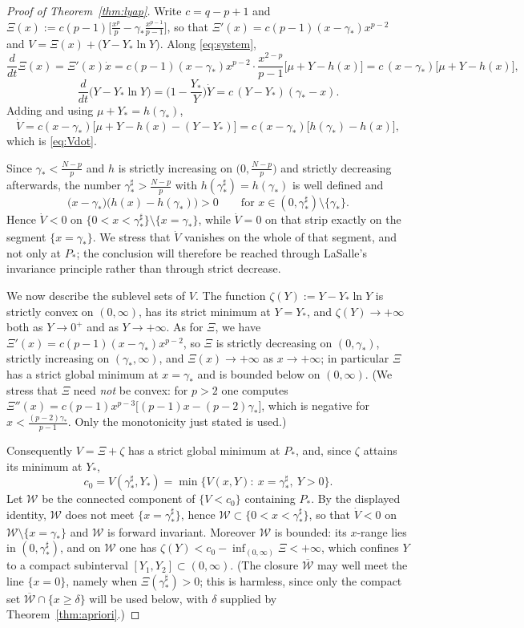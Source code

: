 \documentclass[11pt,reqno]{amsart}
\numberwithin{equation}{section}
\theoremstyle{plain}
\theoremstyle{definition}
\newcommand{\gs}{\gamma_{*}}
\begin{document}
\begin{proof}[Proof of Theorem~\ref{thm:lyap}]
Write $c=q-p+1$ and
$\Xi(x):=c(p-1)\big[\frac{x^{p}}{p}-\gs\frac{x^{p-1}}{p-1}\big]$, so that
$\Xi'(x)=c(p-1)(x-\gs)x^{p-2}$ and $V=\Xi(x)+\big(Y-Y_{*}\ln Y\big)$.
Along \eqref{eq:system},
\[
\frac{d}{dt}\Xi(x)=\Xi'(x)\dot x
=c(p-1)(x-\gs)x^{p-2}\cdot\frac{x^{2-p}}{p-1}\big[\mu+Y-h(x)\big]
=c\,(x-\gs)\big[\mu+Y-h(x)\big],
\]
\[
\frac{d}{dt}\big(Y-Y_{*}\ln Y\big)=\Big(1-\frac{Y_{*}}{Y}\Big)\dot Y
=c\,(Y-Y_{*})(\gs-x).
\]
Adding and using $\mu+Y_{*}=h(\gs)$,
\[
\dot V=c(x-\gs)\big[\mu+Y-h(x)-(Y-Y_{*})\big]
=c(x-\gs)\big[h(\gs)-h(x)\big],
\]
which is \eqref{eq:Vdot}.

Since $\gs<\frac{N-p}{p}$ and $h$ is strictly increasing on
$\big(0,\frac{N-p}{p}\big)$ and strictly decreasing afterwards, the number
$\gs^{\sharp}>\frac{N-p}{p}$ with $h(\gs^{\sharp})=h(\gs)$ is well defined and
\[
\big(x-\gs\big)\big(h(x)-h(\gs)\big)>0\qquad
\text{for } x\in(0,\gs^{\sharp})\setminus\{\gs\} .
\]
Hence $\dot V<0$ on $\{0<x<\gs^{\sharp}\}\setminus\{x=\gs\}$, while $\dot V=0$
on that strip exactly on the segment $\{x=\gs\}$. We stress that $\dot V$
vanishes on the whole of that segment, and not only at $P_{*}$; the conclusion
will therefore be reached through LaSalle's invariance principle rather than
through strict decrease.

We now describe the sublevel sets of $V$. The function
$\zeta(Y):=Y-Y_{*}\ln Y$ is strictly convex on $(0,\infty)$, has its strict
minimum at $Y=Y_{*}$, and $\zeta(Y)\to+\infty$ both as $Y\to0^{+}$ and as
$Y\to+\infty$. As for $\Xi$, we have $\Xi'(x)=c(p-1)(x-\gs)x^{p-2}$, so
$\Xi$ is strictly decreasing on $(0,\gs)$, strictly increasing on
$(\gs,\infty)$, and $\Xi(x)\to+\infty$ as $x\to+\infty$; in particular $\Xi$
has a strict global minimum at $x=\gs$ and is bounded below on $(0,\infty)$.
(We stress that $\Xi$ need \emph{not} be convex: for $p>2$ one computes
$\Xi''(x)=c(p-1)x^{p-3}\big[(p-1)x-(p-2)\gs\big]$, which is negative for
$x<\frac{(p-2)\gs}{p-1}$. Only the monotonicity just stated is used.)

Consequently $V=\Xi+\zeta$ has a strict global minimum at $P_{*}$, and, since
$\zeta$ attains its minimum at $Y_{*}$,
\[
c_{0}=V(\gs^{\sharp},Y_{*})=\min\big\{V(x,Y):\ x=\gs^{\sharp},\ Y>0\big\}.
\]
Let $\mathcal W$ be the connected component of $\{V<c_{0}\}$ containing
$P_{*}$. By the displayed identity, $\mathcal W$ does not meet
$\{x=\gs^{\sharp}\}$, hence $\mathcal W\subset\{0<x<\gs^{\sharp}\}$, so that
$\dot V<0$ on $\mathcal W\setminus\{x=\gs\}$ and $\mathcal W$ is forward
invariant. Moreover $\mathcal W$ is bounded: its $x$-range lies in
$(0,\gs^{\sharp})$, and on $\mathcal W$ one has
$\zeta(Y)<c_{0}-\inf_{(0,\infty)}\Xi<+\infty$, which confines $Y$ to a compact
subinterval $[Y_{1},Y_{2}]\subset(0,\infty)$. (The closure
$\overline{\mathcal W}$ may well meet the line $\{x=0\}$, namely when
$\Xi(\gs^{\sharp})>0$; this is harmless, since only the compact set
$\overline{\mathcal W}\cap\{x\ge\delta\}$ will be used below, with $\delta$
supplied by Theorem~\ref{thm:apriori}.)


\end{proof}
\end{document}
